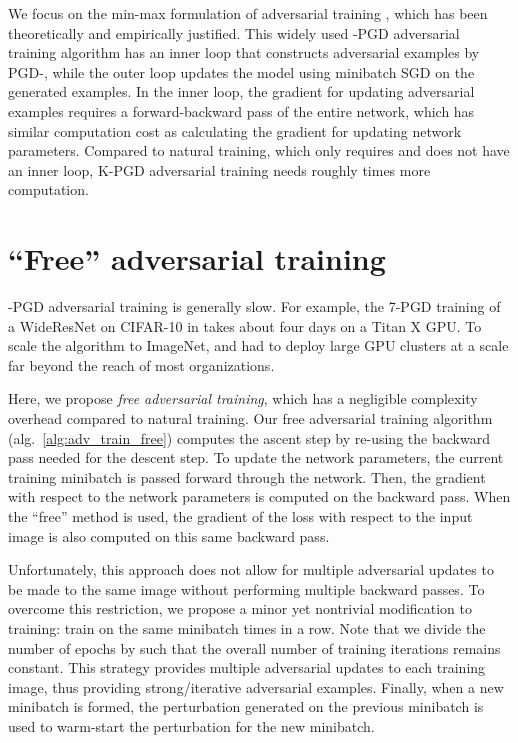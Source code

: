 \documentclass{article}
\begin{document}
We focus on the min-max formulation of adversarial training \citep{madry2017towards}, which has been theoretically and empirically justified. 
 This widely used -PGD adversarial training algorithm 
 has an inner loop that constructs adversarial examples by PGD-, while the outer loop updates the model using minibatch SGD on the generated examples.
 In the inner loop, the gradient  for updating adversarial examples requires a forward-backward pass of the entire network, which has similar computation cost as calculating the gradient  for updating network parameters. Compared to natural training, which only requires  and does not have an inner loop, K-PGD adversarial training needs roughly  times more computation. 





\section{``Free'' adversarial training}
-PGD adversarial training \citep{madry2017towards} is generally slow. For example, the 7-PGD training of a WideResNet \citep{zagoruyko2016wide} on CIFAR-10 in \cite{madry2017towards} takes about four days on a Titan X GPU. To scale the algorithm to ImageNet, \cite{xie2018feature} and \cite{kannan2018adversarial} had to deploy large GPU clusters at a scale far beyond the reach of most organizations. 

Here, we propose {\em free adversarial training}, which has a negligible complexity overhead compared to natural training. Our free adversarial training algorithm (alg.~\ref{alg:adv_train_free}) computes the ascent step by re-using the backward pass needed for the descent step.
To update the network parameters, the current training minibatch is passed forward through the network.  Then, the gradient with respect to the network parameters is computed on the backward pass. 
When the ``free'' method is used, the gradient of the loss with respect to the input image is also computed on this same backward pass.

Unfortunately, this approach does not allow for multiple adversarial updates to be made to the same image without performing multiple backward passes.
To overcome this restriction, we propose a minor yet nontrivial modification to training: train on the same minibatch  times in a row. Note that we divide the number of epochs by  such that the overall number of training iterations remains constant.  This strategy provides multiple adversarial updates to each training image, thus providing strong/iterative adversarial examples.
Finally, when a new minibatch is formed, the perturbation generated on the previous minibatch is used to warm-start the perturbation for the new minibatch. 
\end{document}
